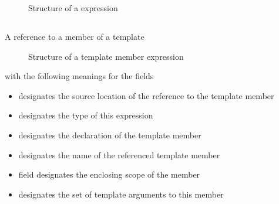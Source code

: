 \begin{figure}[H]
	\centering
	\caption{Structure of a  expression}
	\label{fig:ifc-this-expr-structure}
\end{figure}



\subsection{}
\label{sec:ifc:ExprSort:TemplateReference}

A reference to a member of a template
%
\begin{figure}[H]
	\centering
	\caption{Structure of a template member expression}
	\label{fig:ifc-member-template-expression-structure}
\end{figure}
%
with the following meanings for the fields
\begin{itemize}
	\item {} designates the source location of the reference to the template member
	\item {} designates the type of this expression
	\item {} designates the declaration of the template member
	\item {} designates the name of the referenced template member
	\item {} field designates the enclosing scope of the member
	\item {} designates the set of template arguments to this member
\end{itemize}




